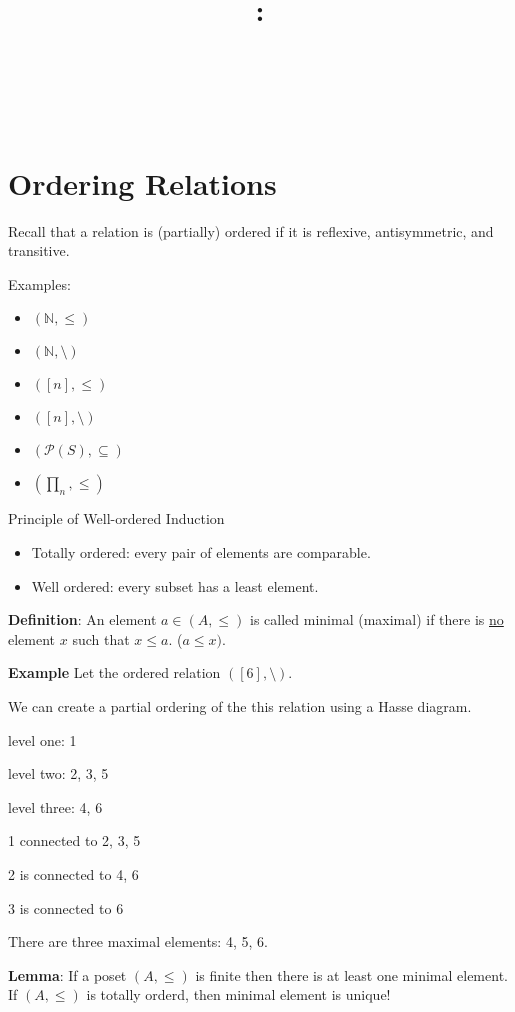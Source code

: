 \documentclass{article}
\title{
    \vspace{2in}
    \textbf{\lectClass:\\ \lectTitle}\\
    \vspace{0.1in}\large{\textit{\lectClassInstructor\ \lectSection}}
    \vspace{3in}
    \author{\textbf{\lectAuthorName}}
    \date{}
}
\begin{document}
\maketitle
\pagebreak

\section*{Ordering Relations}
    Recall that a relation is (partially) ordered if it is reflexive, antisymmetric, and transitive. 
    
    Examples:
    \begin{itemize}
        \item $(\mathbb{N}, \le)$
        \item $(\mathbb{N}, \setminus)$ 
        \item $([n], \le)$
        \item $([n], \setminus)$
        \item $(\mathcal{P}(S), \subseteq)$
        \item $(\prod_{n}, \le)$
    \end{itemize}
    
    Principle of Well-ordered Induction
    \begin{itemize}
        \item Totally ordered: every pair of elements are comparable. 
        \item Well ordered: every subset has a least element.
    \end{itemize}
    
    \textbf{Definition}: An element $a \in (A, \le)$ is called minimal (maximal) if there is \underline{no} element $x$ such that $x \le a$. ($a \le x)$.
    
    \textbf{Example} Let the ordered relation $([6], \setminus)$. 
    
    We can create a partial ordering of the this relation using a Hasse diagram.
    
    level one: 1
    
    level two: 2, 3, 5
    
    level three: 4, 6
    
    1 connected to 2, 3, 5
    
    2 is connected to 4, 6
    
    3 is connected to 6
    
    There are three maximal elements: 4, 5, 6.
    
    \vspace{1.5mm}
    \textbf{Lemma}: If a poset $(A, \le)$ is finite then there is at least one minimal element. If $(A, \le)$ is totally orderd, then minimal element is unique!
    
\end{document}
